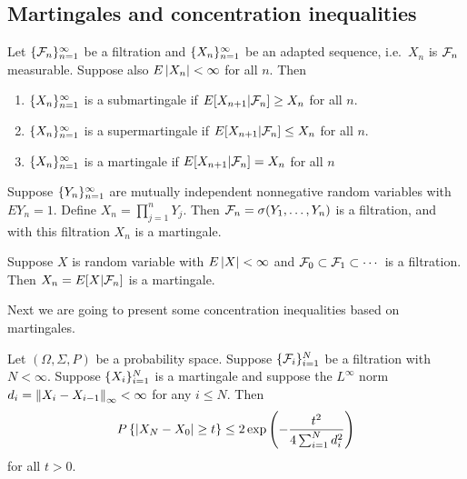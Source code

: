 \documentclass[a4paper]{article}
\begin{document}
\subsection{Martingales and concentration inequalities}

\begin{defi}
  Let $\{ \mathcal{F}_n \}_{n=1}^\infty$ be a filtration and $\{ X_n \}_{n=1}^\infty$ be 
  an adapted sequence, i.e.\ $X_n$ is $\mathcal{F}_n$ measurable. 
  Suppose also $E \left\lvert X_n\right\rvert < \infty$ for all $n$. Then 
  \begin{enumerate}
    \item $\{ X_n \}_{n=1}^\infty$ is a submartingale if 
    $E [X_{n + 1} | \mathcal{F}_n] \geq X_n$ for all $n$.
    \item $\{ X_n \}_{n=1}^\infty$ is a supermartingale if 
    $E [X_{n + 1} | \mathcal{F}_n] \leq X_n$ for all $n$.
    \item $\{ X_n \}_{n=1}^\infty$ is a martingale if 
    $E [X_{n + 1} | \mathcal{F}_n] = X_n$ for all $n$
  \end{enumerate}
\end{defi}

\begin{eg}
  Suppose $\{ Y_n \}_{n=1}^\infty$ are mutually independent nonnegative 
  random variables with $E Y_n = 1$. Define $X_n = \prod_{j=1}^n Y_j$.
  Then $\mathcal{F}_n = \sigma (Y_1, \dots, Y_n)$ is a filtration, 
  and with this filtration $X_n$ is a martingale.
\end{eg}

\begin{eg}
  Suppose $X$ is random variable with $E \left\lvert X\right\rvert < \infty$ 
  and $\mathcal{F}_0 \subset \mathcal{F}_1 \subset \cdots$ is a filtration.
  Then $X_n = E [X | \mathcal{F}_n]$ is a martingale.
\end{eg}

Next we are going to present some concentration inequalities 
based on martingales.

\begin{thm}
  Let $(\Omega, \Sigma, P)$ be a probability space. 
  Suppose $\{ \mathcal{F}_i \}_{i=1}^N$ be a filtration with $N < \infty$.
  Suppose $\{ X_i \}_{i=1}^N$ is a martingale
  and suppose the $L^\infty$ norm 
  $d_i = \left\lVert X_i - X_{i - 1}\right\rVert_\infty < \infty$ for any $i \leq N$.
  Then 
  \[
  P \left\{ \left\lvert X_N - X_0\right\rvert \geq t \right\}
  \leq 2 \exp \left( - \frac{t^2}{4 \sum_{i=1}^N d_i^2} \right)
  \]
  for all $t > 0$.
\end{thm}
\end{document}
